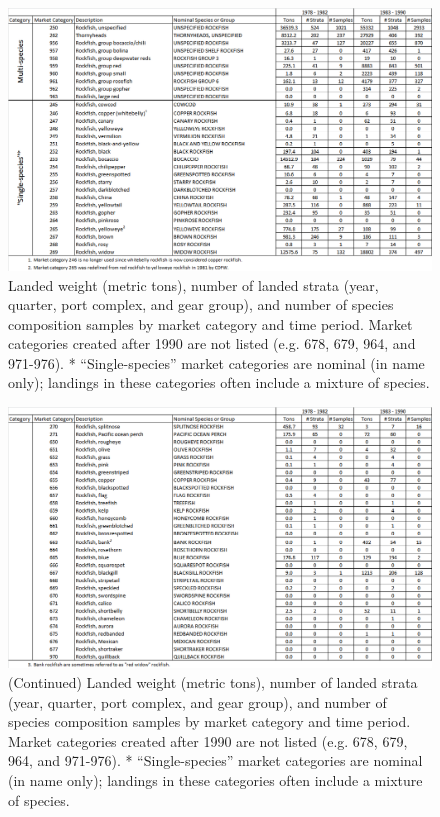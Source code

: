 \documentclass[12pt]{article}
\begin{document}
\begin{landscape}
\begin{figure}
\centering
\includegraphics[width=1.3\textwidth]{./pictures/MC_summary_table_part_1.png}
\caption{Landed weight (metric tons), number of landed strata (year, quarter, 
port complex, and gear group), and number of species composition samples by 
market category and time period. Market categories created after 1990 are not 
listed (e.g. 678, 679, 964, and 971-976). * ``Single-species'' market categories 
are nominal (in name only); landings in these categories often include a 
mixture of species.}
\label{ej1}
\end{figure}
\end{landscape}

\begin{landscape}
\begin{figure}
\centering
\includegraphics[width=1.3\textwidth]{./pictures/MC_summary_table_part_2.png}
\caption{(Continued) Landed weight (metric tons), number of landed strata (year, quarter, 
port complex, and gear group), and number of species composition samples by 
market category and time period. Market categories created after 1990 are not 
listed (e.g. 678, 679, 964, and 971-976). * ``Single-species'' market categories 
are nominal (in name only); landings in these categories often include a 
mixture of species.}
\label{ej2}
\end{figure}
\end{landscape}
\end{document}
